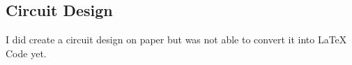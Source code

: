 \pagebreak

\subsection{Circuit Design}

I did create a circuit design on paper but was not able to convert it into LaTeX Code yet.

